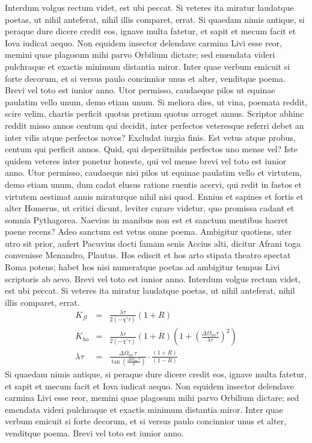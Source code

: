 \documentclass[nochapterpage,bigchapter,linedtoc,longdoc,colorback,accentcolor=tud4c]{tudreport}
\begin{document}
    Interdum volgus rectum videt, est ubi peccat. Si veteres ita miratur laudatque poetas, ut nihil anteferat, nihil illis comparet, errat.  Si quaedam nimis antique, si peraque dure dicere credit eos, ignave multa fatetur, et sapit et mecum facit et Iova iudicat aequo. Non equidem insector delendave carmina Livi esse reor, memini quae plagosum mihi parvo Orbilium dictare; sed emendata videri pulchraque et exactis minimum distantia miror. Inter quae verbum emicuit si forte decorum, et si versus paulo concinnior unus et alter, venditque poema. Brevi vel toto est iunior anno. Utor permisso, caudaeque pilos ut equinae paulatim vello unum, demo etiam unum. Si meliora dies, ut vina, poemata reddit, scire velim, chartis perficit quotus pretium quotus arroget annus. Scriptor abhinc reddit misso annos centum qui decidit, inter perfectos veteresque referri debet an inter vilis atque perfectos novos? Excludat iurgia finis.
    Est vetus atque probus, centum qui perficit annos. Quid, qui deperiitnihis perfectos uno mense vel? Iste quidem veteres inter ponetur honeste, qui vel mense brevi vel toto est iunior anno. Utor permisso, caudaeque nisi pilos ut equinae paulatim vello et virtutem, demo etiam unum, dum cadat elusus ratione ruentis acervi, qui redit in fastos et virtutem aestimat annis miraturque nihil nisi quod. Ennius et sapines et fortis et alter Homerus, ut critici dicunt, leviter curare videtur, quo promissa cadant et somnia Pythagorea.  Naevius in manibus non est et sanctum mentibus haeret paene recens?  Adeo sanctum est vetus omne poema. Ambigitur quotiens, uter utro sit prior, aufert Pacuvius docti famam senis Accius alti, dicitur Afrani toga convenisse Menandro, Plautus. Hos ediscit et hos arto stipata theatro spectat Roma potens; habet hos nisi numeratque poetas ad ambigitur tempus Livi scriptoris ab aevo. Brevi vel toto est iunior anno. Interdum volgus rectum videt, est ubi peccat. Si veteres ita miratur laudatque poetas, ut nihil anteferat, nihil illis comparet, errat. 
	\begin{eqnarray}
		K_{fl}&=&\frac{\lambda\tau}{2(-\chi'\tau)}(1+R)\\
		K_{ho}&=&\frac{\lambda\tau}{2(-\chi'\tau)}(1+R)
			\left(1+\left(\frac{\Delta\Omega_{ho}\tau}{\lambda\tau}\right)^2\right)
			\\
		\lambda\tau&=&
			\frac{\Delta\Omega_{ho}\,\tau}{\tan\left(\frac{\Delta\Omega_{ho}\,\tau}{2}
			\right)}\cdot\frac{(1+R)}{(1-R)}
	\end{eqnarray}
    Si quaedam nimis antique, si peraque dure dicere credit eos, ignave multa fatetur, et sapit et mecum facit et Iova iudicat aequo. Non equidem insector delendave carmina Livi esse reor, memini quae plagosum mihi parvo Orbilium dictare; sed emendata videri pulchraque et exactis minimum distantia miror. Inter quae verbum emicuit si forte decorum, et si versus paulo concinnior unus et alter, venditque poema. Brevi vel toto est iunior anno.
\end{document}
